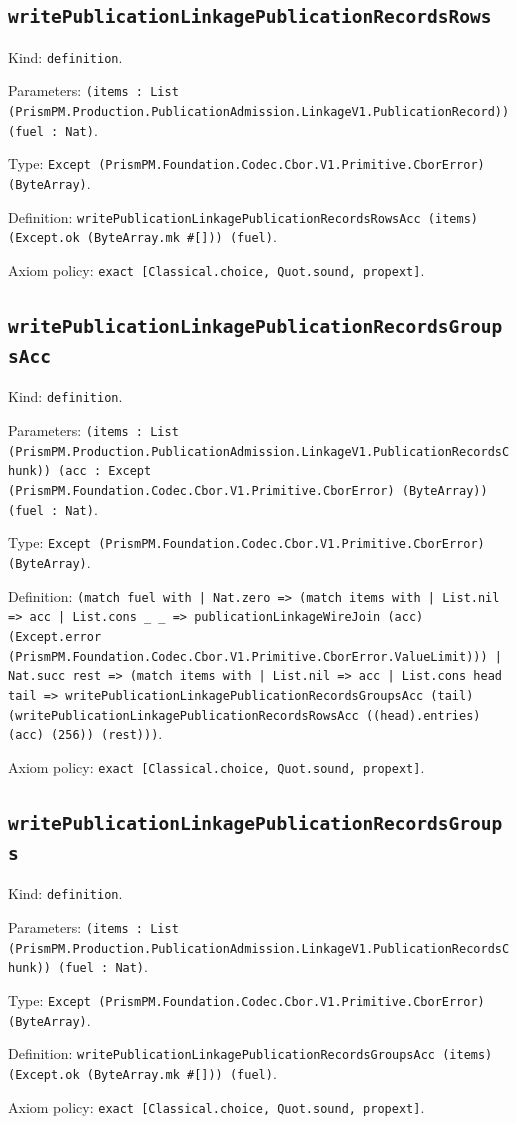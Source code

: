 \documentclass[11pt]{article}
\begin{document}
\subsection*{\texttt{writePublicationLinkagePublicationRecordsRows}}
\noindent Kind: \texttt{definition}.\par
\noindent Parameters: \texttt{(items : List (PrismPM.Production.PublicationAdmission.LinkageV1.PublicationRecord)) (fuel : Nat)}.\par
\noindent Type: \texttt{Except (PrismPM.Foundation.Codec.Cbor.V1.Primitive.CborError) (ByteArray)}.\par
\noindent Definition: \texttt{writePublicationLinkagePublicationRecordsRowsAcc (items) (Except.ok (ByteArray.mk \#[])) (fuel)}.\par
\noindent Axiom policy: \texttt{exact [Classical.choice, Quot.sound, propext]}.\par
\subsection*{\texttt{writePublicationLinkagePublicationRecordsGroupsAcc}}
\noindent Kind: \texttt{definition}.\par
\noindent Parameters: \texttt{(items : List (PrismPM.Production.PublicationAdmission.LinkageV1.PublicationRecordsChunk)) (acc : Except (PrismPM.Foundation.Codec.Cbor.V1.Primitive.CborError) (ByteArray)) (fuel : Nat)}.\par
\noindent Type: \texttt{Except (PrismPM.Foundation.Codec.Cbor.V1.Primitive.CborError) (ByteArray)}.\par
\noindent Definition: \texttt{(match fuel with | Nat.zero => (match items with | List.nil => acc | List.cons \_ \_ => publicationLinkageWireJoin (acc) (Except.error (PrismPM.Foundation.Codec.Cbor.V1.Primitive.CborError.ValueLimit))) | Nat.succ rest => (match items with | List.nil => acc | List.cons head tail => writePublicationLinkagePublicationRecordsGroupsAcc (tail) (writePublicationLinkagePublicationRecordsRowsAcc ((head).entries) (acc) (256)) (rest)))}.\par
\noindent Axiom policy: \texttt{exact [Classical.choice, Quot.sound, propext]}.\par
\subsection*{\texttt{writePublicationLinkagePublicationRecordsGroups}}
\noindent Kind: \texttt{definition}.\par
\noindent Parameters: \texttt{(items : List (PrismPM.Production.PublicationAdmission.LinkageV1.PublicationRecordsChunk)) (fuel : Nat)}.\par
\noindent Type: \texttt{Except (PrismPM.Foundation.Codec.Cbor.V1.Primitive.CborError) (ByteArray)}.\par
\noindent Definition: \texttt{writePublicationLinkagePublicationRecordsGroupsAcc (items) (Except.ok (ByteArray.mk \#[])) (fuel)}.\par
\noindent Axiom policy: \texttt{exact [Classical.choice, Quot.sound, propext]}.\par
\end{document}
